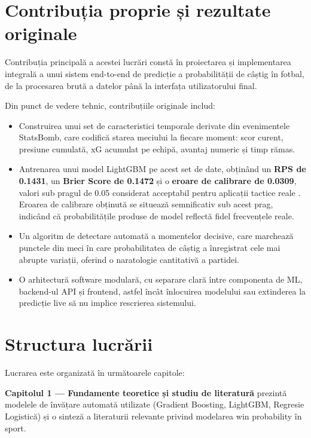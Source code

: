 \section*{Contribuția proprie și rezultate originale}

Contribuția principală a acestei lucrări constă în proiectarea și
implementarea integrală a unui sistem end-to-end de predicție a
probabilității de câștig în fotbal, de la procesarea brută a datelor
până la interfața utilizatorului final.

Din punct de vedere tehnic, contribuțiile originale includ:

\begin{itemize}
    \item Construirea unui set de caracteristici temporale derivate din
    evenimentele StatsBomb, care codifică starea meciului la fiecare
    moment: scor curent, presiune cumulată, xG acumulat pe echipă,
    avantaj numeric și timp rămas.

    \item Antrenarea unui model LightGBM pe acest set de date, obținând
    un \textbf{RPS de 0.1431}, un \textbf{Brier Score de 0.1472} și o
    \textbf{eroare de calibrare de 0.0309}, valori sub pragul de 0.05
    considerat acceptabil pentru aplicații tactice reale
    \cite{Robberechts2019}. Eroarea de calibrare obținută se situează
    semnificativ sub acest prag, indicând că probabilitățile produse de
    model reflectă fidel frecvențele reale.

    \item Un algoritm de detectare automată a momentelor decisive, care
    marchează punctele din meci în care probabilitatea de câștig a
    înregistrat cele mai abrupte variații, oferind o naratologie
    cantitativă a partidei.

    \item O arhitectură software modulară, cu separare clară între
    componenta de ML, backend-ul API și frontend, astfel încât
    înlocuirea modelului sau extinderea la predicție live să nu
    implice rescrierea sistemului.
\end{itemize}

\section*{Structura lucrării}

Lucrarea este organizată în următoarele capitole:

\textbf{Capitolul 1 --- Fundamente teoretice și studiu de literatură}
prezintă modelele de învățare automată utilizate (Gradient Boosting,
LightGBM, Regresie Logistică) și o sinteză a literaturii relevante privind
modelarea win probability în sport.

